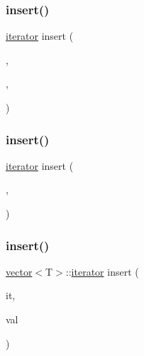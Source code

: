 \mbox{\label{classvector_a602819d5fecd97b2d8c5342e77de7e03}} 
\subsubsection{\texorpdfstring{insert()}{insert()}\hspace{0.1cm}{\footnotesize\ttfamily [4/10]}}
{\footnotesize\ttfamily \mbox{\hyperlink{classvector_a35c955cacac6aacaa1e82874b1628865}{iterator}} insert (\begin{DoxyParamCaption}\item[{\mbox{\hyperlink{classvector_a2fc97dce62b7053449cc868607540dba}{const\+\_\+iterator}}}]{,  }\item[{Input\+It}]{,  }\item[{Input\+It}]{ }\end{DoxyParamCaption})}

\mbox{\label{classvector_a5e06aa6a068907bcf3ea202a6ae96c1c}} 
\subsubsection{\texorpdfstring{insert()}{insert()}\hspace{0.1cm}{\footnotesize\ttfamily [5/10]}}
{\footnotesize\ttfamily \mbox{\hyperlink{classvector_a35c955cacac6aacaa1e82874b1628865}{iterator}} insert (\begin{DoxyParamCaption}\item[{\mbox{\hyperlink{classvector_a2fc97dce62b7053449cc868607540dba}{const\+\_\+iterator}}}]{,  }\item[{std\+::initializer\+\_\+list$<$ T $>$}]{ }\end{DoxyParamCaption})}

\mbox{\label{classvector_acb9bbf19e97c495d1be39c05e32dd999}} 
\subsubsection{\texorpdfstring{insert()}{insert()}\hspace{0.1cm}{\footnotesize\ttfamily [6/10]}}
{\footnotesize\ttfamily \mbox{\hyperlink{classvector}{vector}}$<$T$>$\+::\mbox{\hyperlink{classvector_a35c955cacac6aacaa1e82874b1628865}{iterator}} insert (\begin{DoxyParamCaption}\item[{typename \mbox{\hyperlink{classvector}{vector}}$<$ T $>$\+::\mbox{\hyperlink{classvector_a2fc97dce62b7053449cc868607540dba}{const\+\_\+iterator}}}]{it,  }\item[{const T \&}]{val }\end{DoxyParamCaption})}

